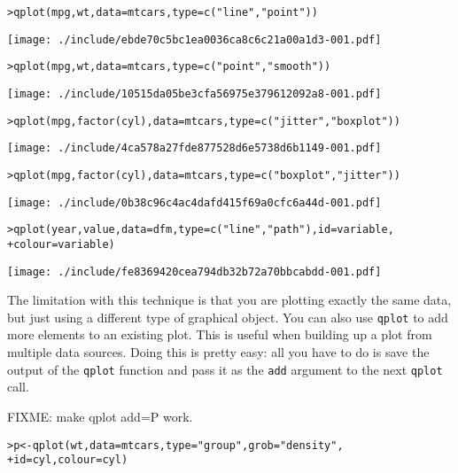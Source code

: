 \begin{alltt}
> qplot(mpg, wt, data = mtcars, type = c("line", "point"))
\end{alltt}
\texttt{[image: ./include/ebde70c5bc1ea0036ca8c6c21a00a1d3-001.pdf]}
\begin{alltt}

> qplot(mpg, wt, data = mtcars, type = c("point", "smooth"))
\end{alltt}
\texttt{[image: ./include/10515da05be3cfa56975e379612092a8-001.pdf]}
\begin{alltt}

> qplot(mpg, factor(cyl), data = mtcars, type = c("jitter", "boxplot"))
\end{alltt}
\texttt{[image: ./include/4ca578a27fde877528d6e5738d6b1149-001.pdf]}
\begin{alltt}

> qplot(mpg, factor(cyl), data = mtcars, type = c("boxplot", "jitter"))
\end{alltt}
\texttt{[image: ./include/0b38c96c4ac4dafd415f69a0cfc6a44d-001.pdf]}
\begin{alltt}

> qplot(year, value, data = dfm, type = c("line", "path"), id = variable, 
+     colour = variable)
\end{alltt}
\texttt{[image: ./include/fe8369420cea794db32b72a70bbcabdd-001.pdf]}
\begin{alltt}

\end{alltt}%

The limitation with this technique is that you are plotting exactly the same data, but just using a different type of graphical object.  You can also use {\tt qplot} to add more elements to an existing plot.  This is useful when building up a plot from multiple data sources. Doing this is pretty easy: all you have to do is save the output of the {\tt qplot} function and pass it as the {\tt add} argument to the next {\tt qplot} call.

FIXME: make qplot add=P work.

\begin{alltt}
> p <- qplot(wt, data = mtcars, type = "group", grob = "density", 
+     id = cyl, colour = cyl)
\end{alltt}%

